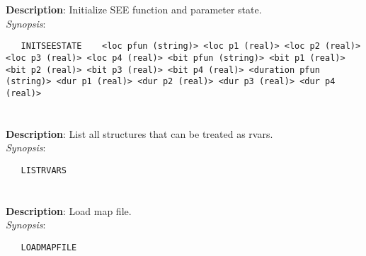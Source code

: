 \section{\quad{}}
\label{manpages:INITSEESTATE}
\label{manpages:initseestate}
\vspace{-0.1in}
{\bf Description}: 	Initialize SEE function and parameter state.\\[1.5ex]
{\em Synopsis}:
\vspace{-0.05in}
\scriptsize
\begin{lstlisting}
   INITSEESTATE    <loc pfun (string)> <loc p1 (real)> <loc p2 (real)> <loc p3 (real)> <loc p4 (real)> <bit pfun (string)> <bit p1 (real)> <bit p2 (real)> <bit p3 (real)> <bit p4 (real)> <duration pfun (string)> <dur p1 (real)> <dur p2 (real)> <dur p3 (real)> <dur p4 (real)>		
\end{lstlisting}
\normalsize
\vspace{-0.05in}


\section{\quad{}}
\label{manpages:LISTRVARS}
\label{manpages:listrvars}
\vspace{-0.1in}
{\bf Description}: 	List all structures that can be treated as rvars.\\[1.5ex]
{\em Synopsis}:
\vspace{-0.05in}
\scriptsize
\begin{lstlisting}
   LISTRVARS   								
\end{lstlisting}
\normalsize
\vspace{-0.05in}


\section{\quad{}}
\label{manpages:LOADMAPFILE}
\label{manpages:loadmapfile}
\vspace{-0.1in}
{\bf Description}: 	Load map file.\\[1.5ex]
{\em Synopsis}:
\vspace{-0.05in}
\scriptsize
\begin{lstlisting}
   LOADMAPFILE   								
\end{lstlisting}
\normalsize
\vspace{-0.05in}



